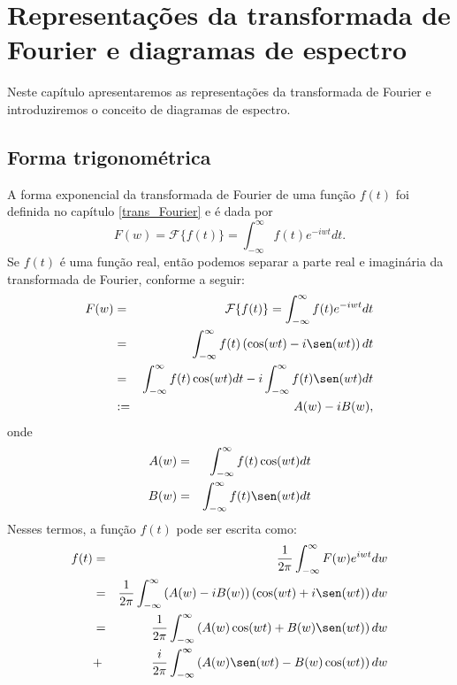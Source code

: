 
\chapter{Representações da transformada de Fourier e diagramas de espectro}
Neste capítulo apresentaremos as representações da transformada de Fourier e introduziremos o conceito de diagramas de espectro.
\section{Forma trigonométrica}
A forma exponencial da transformada de Fourier de uma função $f(t)$ foi definida no capítulo \ref{trans_Fourier} e é dada por
\begin{equation}
F(w)=\mathcal{F}\{f(t)\}=\int_{-\infty}^\infty f(t)e^{-iwt}dt.
\end{equation}
Se $f(t)$ é uma função real, então podemos separar a parte real e imaginária da transformada de Fourier, conforme a seguir:
\begin{eqnarray*}
F(w)&=&\mathcal{F}\{f(t)\}=\int_{-\infty}^\infty f(t)e^{-iwt}dt\\
&=&\int_{-\infty}^\infty f(t)\left(\cos(wt)-i\sen(wt)\right)dt\\
&=&\int_{-\infty}^\infty f(t)\cos(wt)dt-i\int_{-\infty}^\infty f(t)\sen(wt) dt\\
&:=&A(w)-iB(w),
\end{eqnarray*}
onde
\begin{eqnarray*}
A(w)&=&\int_{-\infty}^\infty f(t)\cos(wt)dt\\
B(w)&=&\int_{-\infty}^\infty f(t)\sen(wt) dt
\end{eqnarray*}
Nesses termos, a função $f(t)$ pode ser escrita como:
\begin{eqnarray*}
f(t)&=&\frac{1}{2\pi}\int_{-\infty}^\infty F(w)e^{iwt}dw\\
&=&\frac{1}{2\pi}\int_{-\infty}^\infty \left(A(w)-i B(w)\right)\left(\cos(wt)+i\sen(wt)\right)dw\\
&=&\frac{1}{2\pi}\int_{-\infty}^\infty\left( A(w)\cos(wt)+ B(w)\sen(wt)\right)dw\\&+&\frac{i}{2\pi}\int_{-\infty}^\infty \left(A(w)\sen(wt)- B(w)\cos(wt)\right)dw
\end{eqnarray*}
